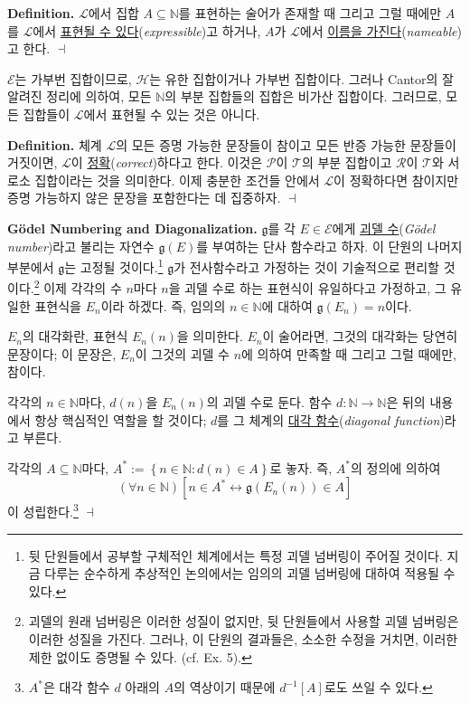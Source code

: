 \documentclass[12pt]{paper}
\newcommand{\gnum}
{ \mathfrak{g} }
\newenvironment{context}[1][]
{ \noindent \textbf{{#1}.} }
{ \hfill $ \dashv $ }
\begin{document}
\begin{context}[Definition]
$\mathcal{L}$에서 집합 $A \subseteq \mathbb{N}$를 표현하는 술어가 존재할 때 그리고 그럴 때에만
$A$를 $\mathcal{L}$에서 \underline{표현될 수 있다}(\textit{expressible})고 하거나,
$A$가 $\mathcal{L}$에서 \underline{이름을 가진다}(\textit{nameable})고 한다.
\end{context}

$\mathcal{E}$는 가부번 집합이므로,
$\mathcal{H}$는 유한 집합이거나 가부번 집합이다.
그러나 Cantor의 잘 알려진 정리에 의하여,
모든 $\mathbb{N}$의 부분 집합들의 집합은 비가산 집합이다.
그러므로, 모든 집합들이 $\mathcal{L}$에서 표현될 수 있는 것은 아니다.

\begin{context}[Definition]
체계 $\mathcal{L}$의 모든 증명 가능한 문장들이 참이고 모든 반증 가능한 문장들이 거짓이면,
$\mathcal{L}$이 \underline{정확}(\textit{correct})하다고 한다.
이것은 $\mathcal{P}$이 $\mathcal{T}$의 부분 집합이고 $\mathcal{R}$이 $\mathcal{T}$와 서로소 집합이라는 것을 의미한다.
이제 충분한 조건들 안에서 $\mathcal{L}$이 정확하다면 참이지만 증명 가능하지 않은 문장을 포함한다는 데 집중하자.
\end{context}

\begin{context}[G\"odel Numbering and Diagonalization]
$\gnum$를 각 $E \in \mathcal{E}$에게 \underline{괴델 수}(\textit{G\"odel number})라고 불리는 자연수 $\gnum \left( E \right)$를 부여하는 단사 함수라고 하자.
이 단원의 나머지 부분에서 $\gnum$는 고정될 것이다.\footnote
{
뒷 단원들에서 공부할 구체적인 체계에서는 특정 괴델 넘버링이 주어질 것이다.
지금 다루는 순수하게 추상적인 논의에서는 임의의 괴델 넘버링에 대하여 적용될 수 있다.
}
$\gnum$가 전사함수라고 가정하는 것이 기술적으로 편리할 것이다.\footnote
{
괴델의 원래 넘버링은 이러한 성질이 없지만,
뒷 단원들에서 사용할 괴델 넘버링은 이러한 성질을 가진다.
그러나, 이 단원의 결과들은, 소소한 수정을 거치면,
이러한 제한 없이도 증명될 수 있다.
(cf. Ex. 5).
}
이제 각각의 수 $n$마다 $n$을 괴델 수로 하는 표현식이 유일하다고 가정하고,
그 유일한 표현식을 $E_{n}$이라 하겠다.
즉, 임의의 $n \in \mathbb{N}$에 대하여 $\gnum \left( E_{n} \right) = n$이다.

$E_{n}$의 대각화란, 표현식 $E_{n} \left( n \right)$을 의미한다.
$E_{n}$이 술어라면, 그것의 대각화는 당연히 문장이다;
이 문장은, $E_{n}$이 그것의 괴델 수 $n$에 의하여 만족할 때 그리고 그럴 때에만, 참이다.

각각의 $n \in \mathbb{N}$마다, $d \left( n \right)$을 $E_{n} \left( n \right)$의 괴델 수로 둔다.
함수 $d : \mathbb{N} \to \mathbb{N}$은 뒤의 내용에서 항상 핵심적인 역할을 할 것이다;
$d$를 그 체계의 \underline{대각 함수}(\textit{diagonal function})라고 부른다.

각각의 $A \subseteq \mathbb{N}$마다, $A^{*} := \left\{ n \in \mathbb{N} : d \left( n \right) \in A \right\} $로 놓자.
즉, $A^{*}$의 정의에 의하여 $$ \left( \forall n \in \mathbb{N} \right) \left[ n \in A^{*} \leftrightarrow \gnum \left( E_{n} \left( n \right) \right) \in A \right] $$이 성립한다.\footnote
{
$A^{*}$은 대각 함수 $d$ 아래의 $A$의 역상이기 때문에 $d^{-1} \left[ A \right]$로도 쓰일 수 있다.
}
\end{context}
\end{document}
